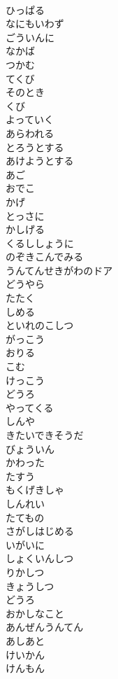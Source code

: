 \documentclass[8pt]{extreport}
\begin{document}
\begin{CJK}{UTF8}{min}
\\	ひっぱる
\\	なにもいわず
\\	ごういんに
\\	なかば
\\	つかむ
\\	てくび
\\	そのとき
\\	くび
\\	よっていく
\\	あらわれる
\\	とろうとする
\\	あけようとする
\\	あご
\\	おでこ
\\	かげ
\\	とっさに
\\	かしげる
\\	くるししょうに
\\	のぞきこんでみる
\\	うんてんせきがわのドア
\\	どうやら
\\	たたく
\\	しめる
\\	といれのこしつ
\\	がっこう
\\	おりる
\\	こむ
\\	けっこう
\\	どうろ
\\	やってくる
\\	しんや
\\	きたいできそうだ
\\	びょういん
\\	かわった
\\	たすう
\\	もくげきしゃ
\\	しんれい
\\	たてもの
\\	さがしはじめる
\\	いがいに
\\	しょくいんしつ
\\	りかしつ
\\	きょうしつ
\\	どうろ
\\	おかしなこと
\\	あんぜんうんてん
\\	あしあと
\\	けいかん
\\	けんもん

\end{CJK}
\end{document}
